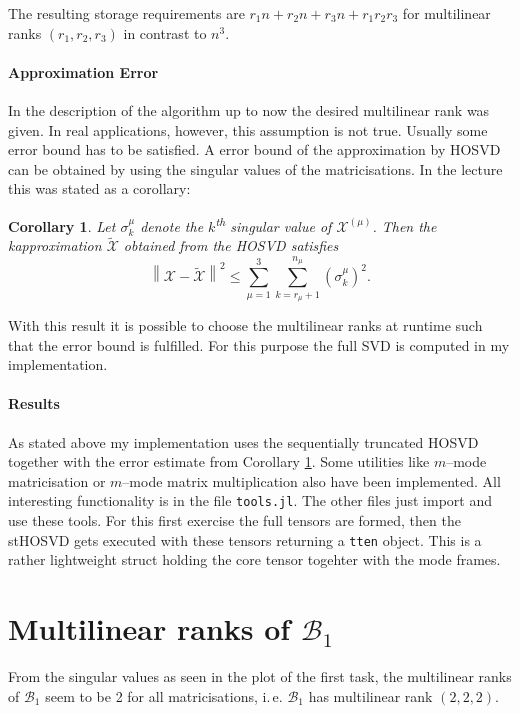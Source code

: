 \documentclass[%
a4paper,
parskip=half,
DIV=calc,
]
{scrartcl}
\newtheorem{corollary}[theorem]{Corollary}
\begin{document}
The resulting storage requirements are
$r_1 n + r_2 n + r_3 n + r_1 r_2 r_3$ for multilinear ranks
$(r_1, r_2, r_3)$ in contrast to $n^3$.

\paragraph{Approximation Error}

In the description of the algorithm up to now the desired multilinear
rank was given.  In real applications, however, this assumption is not
true.  Usually some error bound has to be satisfied.  A error bound of
the approximation by HOSVD can be obtained by using the singular
values of the matricisations.  In the lecture this was stated as a corollary:
\begin{corollary}
  \label{cor:err}
  Let $\sigma_k^{\mu}$ denote the $k$\textsuperscript{th} singular
  value of $\mathcal{X}^{(\mu)}$.  Then the kapproximation
  $\tilde{\mathcal{X}}$ obtained from the HOSVD satisfies
  \begin{equation*}
    \left\| \mathcal{X} - \tilde{\mathcal{X}} \right\|^2 \leq \sum_{\mu = 1}^3 \sum_{k = r_\mu + 1}^{n_\mu}
    \left( \sigma_k^\mu \right)^2.
  \end{equation*}
\end{corollary}
With this result it is possible to choose the multilinear ranks at
runtime such that the error bound is fulfilled.  For this purpose the
full SVD is computed in my implementation.

\paragraph{Results}

As stated above my implementation uses the sequentially truncated
HOSVD together with the error estimate from Corollary \ref{cor:err}.
Some utilities like $m$--mode matricisation or $m$--mode matrix
multiplication also have been implemented. All interesting
functionality is in the file \texttt{tools.jl}. The other files just
import and use these tools.  For this first exercise the full tensors
are formed, then the stHOSVD gets executed with these tensors
returning a \texttt{tten} object. This is a rather lightweight struct
holding the core tensor togehter with the mode frames.

%

\section{Multilinear ranks of $\mathcal{B}_1$}
\label{sec:mrb1}
From the singular values as seen in
the plot of the first task, the multilinear ranks of $\mathcal{B}_1$
seem to be 2 for all matricisations, i.\,e. $\mathcal{B}_1$ has
multilinear rank $(2, 2, 2)$.
\end{document}
